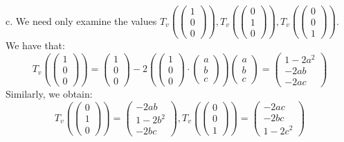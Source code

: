 \begin{solution}
    c. We need only examine the values $T_v(\begin{pmatrix} 1 \\ 0 \\ 0
    \end{pmatrix}), T_v(\begin{pmatrix}  0 \\ 1 \\ 0 \end{pmatrix}), T_v(\begin{pmatrix} 0 \\ 0 \\ 1 \end{pmatrix})$. We have that:
    $$T_v(\begin{pmatrix} 1 \\ 0 \\ 0
    \end{pmatrix}) = \begin{pmatrix} 1 \\ 0 \\ 0 \end{pmatrix} - 2(\begin{pmatrix} 1 \\ 0 \\ 0 \end{pmatrix} \cdot \begin{pmatrix} a \\ b \\ c \end{pmatrix}) \begin{pmatrix} a \\ b \\ c \end{pmatrix} =  \begin{pmatrix} 1 - 2a^2 \\ -2ab \\ -2ac \end{pmatrix}$$
    Similarly, we obtain:
    $$T_v(\begin{pmatrix}  0 \\ 1 \\ 0 \end{pmatrix}) = \begin{pmatrix} -2ab \\ 1 - 2b^2 \\ -2bc \end{pmatrix}, T_v(\begin{pmatrix}  0 \\ 0 \\ 1 \end{pmatrix}) = \begin{pmatrix} -2ac \\ -2bc \\ 1 - 2c^2 \end{pmatrix}$$


\end{solution}
